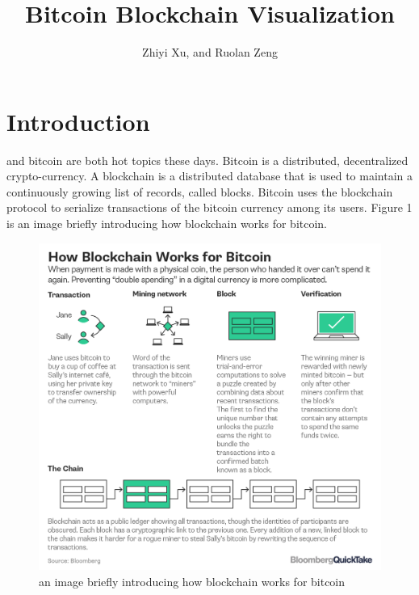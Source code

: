 \documentclass[journal, a4paper]{IEEEtran}
\begin{document}
	\title{Bitcoin Blockchain Visualization}
	\author{Zhiyi Xu, and Ruolan Zeng}
	\maketitle
                                                   
\section{Introduction}
	 and bitcoin are both hot topics these days. Bitcoin is a distributed, decentralized crypto-currency. A blockchain is a distributed database that is used to maintain a continuously growing list of records, called blocks. Bitcoin uses the blockchain protocol to serialize transactions of the bitcoin currency among its users. Figure 1 is an image briefly introducing how blockchain works for bitcoin.
\begin{figure}[!hbt]
		\begin{center}
		\includegraphics[width=\columnwidth]{how_blockchain_works.png}
		\caption{an image briefly introducing how blockchain works for bitcoin}
		\label{fig:how_blockchain_works}
		\end{center}
	\end{figure}
\end{document}
